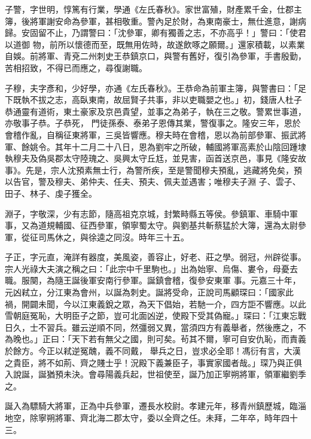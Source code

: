 \begin{pinyinscope}
 子警，字世明，惇篤有行業，學通《左氏春秋》。家世富殖，財產累千金，仕郡主簿，後將軍謝安命為參軍，甚相敬重。警內足於財，為東南豪士，無仕進意，謝病歸。安固留不止，乃謂警曰：「沈參軍，卿有獨善之志，不亦高乎！」警曰：「使君以道御
 物，前所以懷德而至，既無用佐時，故遂飲啄之願爾。」還家積載，以素業自娛。前將軍、青兗二州刺史王恭鎮京口，與警有舊好，復引為參軍，手書殷勤，苦相招致，不得已而應之，尋復謝職。



 子穆，夫字彥和，少好學，亦通《左氏春秋》。王恭命為前軍主簿，與警書曰：「足下既執不拔之志，高臥東南，故屈賢子共事，非以吏職嬰之也。」初，錢唐人杜子恭通靈有道術，東土豪家及京邑貴望，並事之為弟子，執在三之敬。警累世事道，亦敬事子恭。子恭死，
 門徒孫泰、泰弟子恩傳其業，警復事之。隆安三年，恩於會稽作亂，自稱征東將軍，三吳皆響應。穆夫時在會稽，恩以為前部參軍、振武將軍、餘姚令。其年十二月二十八日，恩為劉牢之所破，輔國將軍高素於山陰回踵埭執穆夫及偽吳郡太守陸瑰之、吳興太守丘尪，並見害，函首送京邑，事見《隆安故事》。先是，宗人沈預素無士行，為警所疾，至是警聞穆夫預亂，逃藏將免矣，預以告官，警及穆夫、弟仲夫、任夫、預夫、佩夫並遇害；唯穆夫子淵
 子、雲子、田子、林子、虔子獲全。



 淵子，字敬深，少有志節，隨高祖克京城，封繁畤縣五等侯。參鎮軍、車騎中軍事，又為道規輔國、征西參軍，領寧蜀太守。與劉基共斬蔡猛於大簿，還為太尉參軍，從征司馬休之，與徐逵之同沒。時年三十五。



 子正，字元直，淹詳有器度，美風姿，善容止，好老、莊之學。弱冠，州辟從事。宗人光祿大夫演之稱之曰：「此宗中千里駒也。」出為始寧、烏傷、婁令，母憂去職。服闋，為隨王誕後軍安南行參軍。誕鎮會稽，復參安東軍
 事。元嘉三十年，元凶弒立，分江東為會州，以誕為刺史。誕將受命，正說司馬顧琛曰：「國家此禍，開闢未聞，今以江東義銳之眾，為天下倡始，若馳一介，四方詎不響應。以此雪朝庭冤恥，大明臣子之節，豈可北面凶逆，使殿下受其偽寵。」琛曰：「江東忘戰日久，士不習兵。雖云逆順不同，然彊弱又異，當須四方有義舉者，然後應之，不為晚也。」正曰：「天下若有無父之國，則可矣。茍其不爾，寧可自安仇恥，而責義於餘方。今正以弒逆冤醜，義不同戴，
 舉兵之日，豈求必全耶！馮衍有言，大漢之貴臣，將不如荊、齊之賤士乎！況殿下義兼臣子，事實家國者哉。」琛乃與正俱入說誕，誕猶預未決。會尋陽義兵起，世祖使至，誕乃加正寧朔將軍，領軍繼劉季之。



 誕入為驃騎大將軍，正為中兵參軍，遷長水校尉。孝建元年，移青州鎮歷城，臨淄地空，除寧朔將軍、齊北海二郡太守，委以全齊之任。未拜，二年卒，時年四十三。




\end{pinyinscope}
